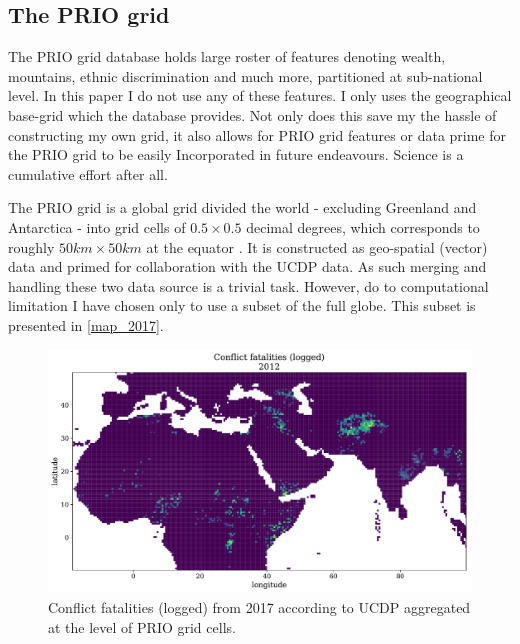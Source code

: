 \documentclass[a4paper]{article}
\begin{document}
\subsection{The PRIO grid}

The PRIO grid database holds large roster of features denoting wealth, mountains, ethnic discrimination and much more, partitioned at sub-national level. In this paper I do not use any of these features. I only uses the geographical base-grid which the database provides. Not only does this save my the hassle of constructing my own grid, it also allows for PRIO grid features or data prime for the PRIO grid to be easily Incorporated in future endeavours. Science is a cumulative effort after all.\par 

The PRIO grid is a global grid divided the world - excluding Greenland and Antarctica - into grid cells of $0.5 \times 0.5$ decimal degrees, which corresponds to roughly $50km\times50km$ at the equator \citep[367]{Tollefsen_2012}. It is constructed as geo-spatial (vector) data and primed for collaboration with the UCDP data. As such merging and handling these two data source is a trivial task. However, do to computational limitation I have chosen only to use a subset of the full globe. This subset is presented in \autoref{map_2017}.\par

\begin{figure}[!htb]
	\centering
	\includegraphics[scale=0.5]{log_best_2012_samples.pdf}
    \caption{\footnotesize{Conflict fatalities (logged) from 2017 according to UCDP aggregated at the level of PRIO grid cells.}}\label{map_2017}
\end{figure}
\end{document}
